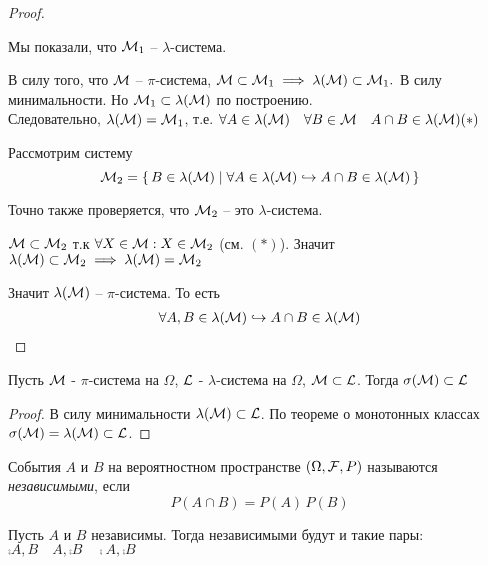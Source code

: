 \begin{proof}
\begin{enumerate}
	\end{enumerate}
			Мы показали, что $\mathcal{M}_1$ -- $\lambda$-система.

			В силу того, что $\mathcal{M}$ -- $\pi$-система, $\mathcal{M} \subset \mathcal{M}_1 
			\implies \lambda(\mathcal{M}) \subset \mathcal{M}_1.$ 
			В силу минимальности. Но $\mathcal{M}_1 \subset \lambda(\mathcal{M})$ по построению. \\
			Следовательно, $\lambda(\mathcal{M}) = \mathcal{M}_1$, т.е. 
			$\forall A \in \lambda(\mathcal{M}) \quad \forall B \in \mathcal{M} \quad A \cap B \in \lambda(\mathcal{M}) (*)$
			
			Рассмотрим систему
			\begin{equation*}
				\mathcal{M}_2 = \left\{ \, B \in \lambda(\mathcal{M}) \mid \forall A \in \lambda(\mathcal{M}) \hookrightarrow A \cap B \in \lambda(\mathcal{M}) \, \right\}
			\end{equation*}

			Точно также проверяется, что $\mathcal{M}_2$ -- это $\lambda$-система.

			$\mathcal{M} \subset \mathcal{M}_2$ т.к $\forall X \in \mathcal{M}: X \in \mathcal{M}_2$  (см. $(*)$).
			Значит $\lambda(\mathcal{M}) \subset \mathcal{M}_2 \implies \lambda(\mathcal{M}) = \mathcal{M}_2$
			
			Значит $\lambda(\mathcal{M})$ -- $\pi$-система. То есть 
			\begin{align*}
				\forall A, B \in \lambda(\mathcal{M}) \hookrightarrow A \cap B \in \lambda(\mathcal{M})
			\end{align*}
\end{proof}

\begin{corollary}
	Пусть $\mathcal{M}$ - $\pi$-система на $\Omega$, $\mathcal{L}$ - $\lambda$-система на $\Omega$, $\mathcal{M} \subset \mathcal{L}$. Тогда $\sigma(\mathcal{M}) \subset \mathcal{L}$
\end{corollary}
\begin{proof}
	В силу минимальности $\lambda(\mathcal{M}) \subset \mathcal{L}$.
	По теореме о монотонных классах $\sigma(\mathcal{M}) = \lambda(\mathcal{M}) \subset \mathcal{L}$.
\end{proof}


\begin{definition}
	События $A$ и $B$ на вероятностном пространстве $(\Omega, \mathcal{F}, P)$ 
	называются \emph{независимыми}, если
	\begin{equation*}
		P(A \cap B) = P(A) \, P(B)
	\end{equation*}
\end{definition}

\begin{exercise}
	Пусть $A$ и $B$ независимы. Тогда независимыми будут и такие пары:\\
	$\comp{A}, B \quad A, \comp{B} \quad \comp{A}, \comp{B}$
\end{exercise}
 
